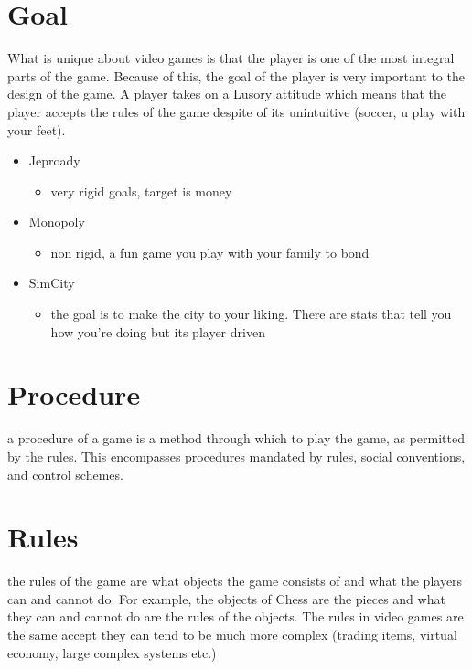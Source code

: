 \documentclass[12pt]{book}
\title{\coursetitle\linebreak\lecturename}
\author{\\Cain Susko\\ 
           \\ \\ \\
      Queen's University 
    \\School of Computing\\}
\begin{document}
\begin{titlepage}
        \maketitle
\end{titlepage}


\section*{Goal}
What is unique about video games is that the player is one of the most integral parts of the game.
Because of this, the goal of the player is very important to the design of the game.
A player takes on a Lusory attitude which means that the player accepts the rules of the game despite of its unintuitive
(soccer, u play with your feet).
\begin{itemize}
        \item Jeproady
        \begin{itemize}
                \item very rigid goals, target is money
        \end{itemize}
        \item Monopoly
        \begin{itemize}
                \item non rigid, a fun game you play with your family to bond
        \end{itemize}
        \item SimCity
        \begin{itemize}
                \item the goal is to make the city to your liking. 
                        There are stats that tell you how you're doing but its player driven
        \end{itemize}
\end{itemize}

\section*{Procedure}
a procedure of a game is a method through which to play the game, as permitted by the rules.
This encompasses procedures mandated by rules, social conventions, and control schemes.

\section*{Rules}
the rules of the game are what objects the game consists of and what the players can and cannot do.
For example, the objects of Chess are the pieces and what they can and cannot do are the rules of the objects.
The rules in video games are the same accept they can tend to be much more complex (trading items, virtual economy, 
large complex systems etc.)
\end{document}
